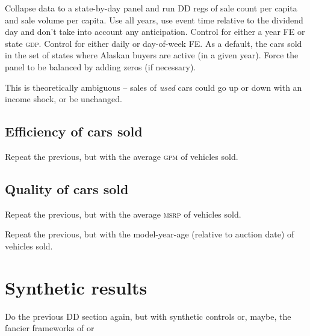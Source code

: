 \documentclass[11pt,letterpaper,oneside]{article}
\newcommand{\gpm}{\textsc{gpm}}
\newcommand{\msrp}{\textsc{msrp}}
\newcommand{\gdp}{\textsc{gdp}}
\begin{document}
Collapse data to a state-by-day panel and run DD regs of sale count per capita and sale volume per capita.
Use all years, use event time relative to the dividend day and don't take into account any anticipation.
Control for either a year FE or state \gdp{}. Control for either daily or day-of-week FE.
As a default, the cars sold in the set of states where Alaskan buyers are active (in a given year).
Force the panel to be balanced by adding zeros (if necessary).

This is theoretically ambiguous -- sales of \emph{used} cars could go up or down with an income shock, or be unchanged.





\subsection{Efficiency of cars sold}
Repeat the previous, but with the average \gpm{} of vehicles sold.

\subsection{Quality of cars sold}
Repeat the previous, but with the average \msrp{} of vehicles sold.

Repeat the previous, but with the model-year-age (relative to auction date) of vehicles sold.


\section{Synthetic results}
Do the previous DD section again, but with synthetic controls or, maybe, the fancier frameworks of
\textcite{DoudchenkoImbens2016DD} or \textcite{Xu2016}




%
%
\end{document}
